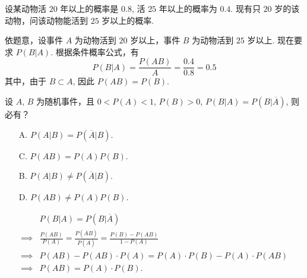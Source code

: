\documentclass[12pt, a4paper, oneside, UTF8]{ctexbook}
\begin{document}
\begin{example}
    设某动物活 \(20\) 年以上的概率是 \(0.8\), 活 \(25\) 年以上的概率为 \(0.4\). 现有只 \(20\) 岁的该动物，问该动物能活到 \(25\) 岁以上的概率.
\end{example}

\begin{solution}
    依题意，设事件 \(A\) 为动物活到 \(20\) 岁以上，事件 \(B\) 为动物活到 \(25\) 岁以上. 现在要求 \(P\left(B | A\right)\). 根据条件概率公式，有
    \[P\left(B | A\right) = \frac{P\left(AB\right)}{A} = \frac{0.4}{0.8} = 0.5\]
    其中，由于 \(B \subset A\), 因此 \(P\left(AB\right) = P\left(B\right)\).
\end{solution}

\begin{example}
    设 \(A\), \(B\) 为随机事件，且 \(0 < P\left(A\right) < 1\), \(P\left(B\right) > 0\), \(P\left(B | A\right) = P\left(B | \overline{A}\right)\), 则必有？
      
    \vspace{0.5cm}

    \begin{minipage}[l]{0.45\textwidth}
        \begin{enumerate}
            \item[A.] \(P\left(A | B\right) = P\left(\overline{A} | B\right)\).
            \item[C.] \(P\left(AB\right) = P\left(A\right)P\left(B\right)\).
        \end{enumerate}
    \end{minipage}
    \begin{minipage}[c]{0.45\textwidth}
        \begin{enumerate}
            \item[B.] \(P\left(A | B\right) \neq P\left(\overline{A} | B\right)\).
            \item[D.] \(P\left(AB\right) \neq P\left(A\right)P\left(B\right)\).
        \end{enumerate}
    \end{minipage}
\end{example}

\begin{solution}
    \begin{align*}
        &P\left(B | A\right) = P\left(B | \overline{A}\right)\\
        \implies  & \frac{P\left(AB\right)}{P\left(A\right)} = \frac{P\left(\overline{A} B\right)}{P\left(\overline{A}\right)} = \frac{P\left(B\right) - P\left(AB\right)}{1 - P\left(A\right)}\\
        \implies & P\left(AB\right) - P\left(AB\right)\cdot P\left(A\right) = P\left(A\right) \cdot P\left(B\right) - P\left(A\right)\cdot P\left(AB\right)\\
        \implies & P\left(AB\right) = P\left(A\right) \cdot P\left(B\right).
    \end{align*}
\end{solution}
\end{document}
